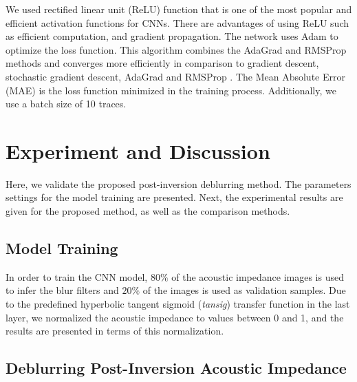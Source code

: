 \documentclass[journal]{IEEEtran}
\begin{document}
We used rectified linear unit (ReLU) function that is one
of the most popular and efficient activation functions for
CNNs. There are advantages of using ReLU such as efficient
computation, and gradient propagation. The network uses
Adam to optimize the loss function. This algorithm
combines the AdaGrad and RMSProp methods and converges more efficiently in
comparison to gradient descent, stochastic gradient descent, AdaGrad
and RMSProp \cite{Kingma2014}. The Mean Absolute Error (MAE) is the
loss function minimized in the training process. Additionally, we use
a batch size of 10 traces.

\section{Experiment and Discussion}\label{Experiments}
Here, we validate the proposed post-inversion deblurring method.
The parameters settings for the model training are presented.
Next, the experimental results are given for the proposed method,
as well as the comparison methods.

\subsection{Model Training}
In order to train the CNN model, $80\%$ of the acoustic impedance images
is used to infer the blur filters and $20\%$ of the images is used as 
validation samples. Due to the predefined hyperbolic tangent
sigmoid (\textit{tansig}) transfer function in the last layer, we
normalized the acoustic impedance to values between 0 and 1,
and the results are presented in terms of this normalization.

\subsection{Deblurring Post-Inversion Acoustic Impedance}
\end{document}
